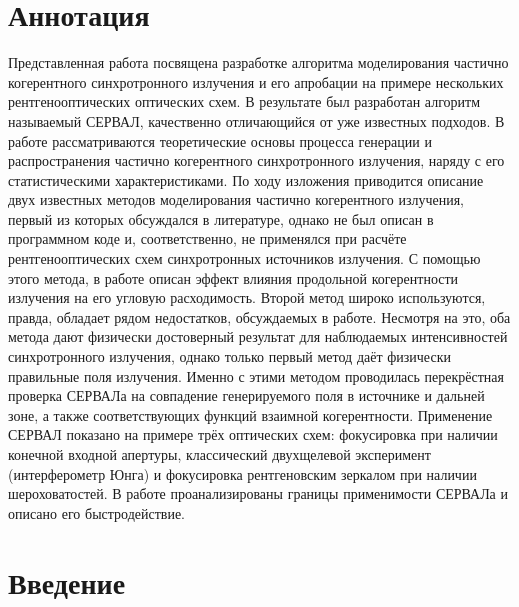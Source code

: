 \chapter*{Аннотация }							%
Представленная работа посвящена разработке алгоритма моделирования частично когерентного синхротронного излучения и его апробации на примере нескольких рентгенооптических оптических схем. В результате был разработан алгоритм называемый СЕРВАЛ, качественно отличающийся от уже известных подходов. В работе рассматриваются теоретические основы процесса генерации и распространения частично когерентного синхротронного излучения, наряду с его статистическими характеристиками. По ходу изложения приводится описание двух известных методов моделирования частично когерентного излучения, первый из которых обсуждался в литературе, однако не был описан в программном коде и, соответственно, не применялся при расчёте рентгенооптических схем синхротронных источников излучения. С помощью этого метода, в работе описан эффект влияния продольной когерентности излучения на его угловую расходимость. Второй метод широко используются, правда, обладает рядом недостатков, обсуждаемых в работе. Несмотря на это, оба метода дают физически достоверный результат для наблюдаемых интенсивностей синхротронного излучения, однако только первый метод даёт физически правильные поля излучения. Именно с этими методом проводилась перекрёстная проверка СЕРВАЛа на совпадение генерируемого поля в источнике и дальней зоне, а также соответствующих функций взаимной когерентности. Применение СЕРВАЛ показано на примере трёх оптических схем: фокусировка при наличии конечной входной апертуры, классический двухщелевой эксперимент (интерферометр Юнга) и фокусировка рентгеновским зеркалом при наличии шероховатостей. В работе проанализированы границы применимости СЕРВАЛа и описано его быстродействие.
\chapter*{Введение}							%

\newcommand{\actuality}{Актуальность}
\newcommand{\aim}{\textbf{Целью}}
\newcommand{\tasks}{Задачи}
\newcommand{\defpositions}{\textbf{Основные положения, выносимые на~защиту:}}
\newcommand{\novelty}{\textbf{Научная новизна}}
\newcommand{\influence}{\textbf{Научная и практическая значимость}}
\newcommand{\reliability}{\textbf{Степень достоверности}}
\newcommand{\probation}{\textbf{Апробация работы.}}
\newcommand{\contribution}{\textbf{Личный вклад.}}
\newcommand{\publications}{\textbf{Публикации.}}

